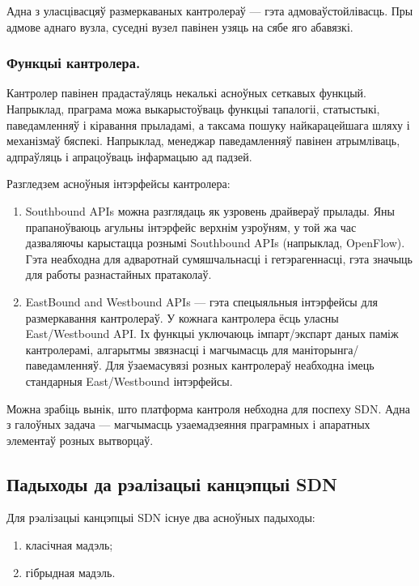 Адна з уласцівасцяў размеркаваных кантролераў --- гэта адмоваўстойлівасць.
Пры адмове аднаго вузла, суседні вузел павінен узяць на сябе яго абавязкі.

\subsubsection{Функцыі кантролера.}

Кантролер павінен прадастаўляць некалькі асноўных сеткавых функцый.
Напрыклад, праграма можа выкарыстоўваць функцыі тапалогіі, статыстыкі, паведамленняў і
кіравання прыладамі, а таксама пошуку найкарацейшага шляху і механізмаў бяспекі.
Напрыклад, менеджар паведамленняў павінен атрымліваць, адпраўляць і апрацоўваць
інфармацыю ад падзей.

Разгледзем асноўныя інтэрфейсы кантролера:
\begin{enumerate}
    \item Southbound APIs можна разглядаць як узровень драйвераў прылады.
    Яны прапаноўваюць агульны інтэрфейс верхнім узроўням, у той жа час дазваляючы
    карыстацца рознымі Southbound APIs (напрыклад, OpenFlow). Гэта неабходна для
    адваротнай сумяшчальнасці і гетэрагеннасці, гэта значыць для работы разнастайных
    пратаколаў.
    \item EastBound and Westbound APIs --- гэта спецыяльныя інтэрфейсы для размеркавання
    кантролераў. У кожнага кантролера ёсць уласны East/Westbound API. Іх функцыі уключаюць
    імпарт/экспарт даных паміж кантролерамі, алгарытмы звязнасці і магчымасць для
    маніторынга/паведамленняў. Для ўзаемасувязі розных кантролераў неабходна
    імець стандарныя East/Westbound інтэрфейсы.
\end{enumerate}

Можна зрабіць вынік, што платформа кантроля небходна для поспеху SDN. Адна з галоўных
задача --- магчымасць узаемадзеяння праграмных і апаратных элементаў розных вытворцаў.

\subsection{Падыходы да рэалізацыі канцэпцыі SDN}

Для рэалізацыі канцэпцыі SDN існуе два асноўных падыходы:
\begin{enumerate}
    \item класічная мадэль;
    \item гібрыдная мадэль.
\end{enumerate}

